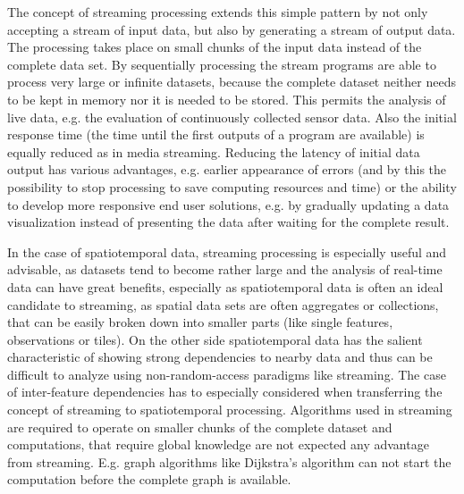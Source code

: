 	The concept of streaming processing extends this simple pattern by not only accepting a stream of input data, but also by generating a stream of output data. The processing takes place on small chunks of the input data instead of the complete data set. By sequentially processing the stream programs are able to process very large or infinite datasets, because the complete dataset neither needs to be kept in memory nor it is needed to be stored. This permits the analysis of live data, e.g. the evaluation of continuously collected sensor data. Also the initial response time (the time until the first outputs of a program are available) is equally reduced as in media streaming. Reducing the latency of initial data output has various advantages, e.g. earlier appearance of errors (and by this the possibility to stop processing to save computing resources and time) or the ability to develop more responsive end user solutions, e.g. by gradually updating a data visualization instead of presenting the data after waiting for the complete result.

	In the case of spatiotemporal data, streaming processing is especially useful and advisable, as datasets tend to become rather large and the analysis of real-time data can have great benefits, especially as spatiotemporal data is often an ideal candidate to streaming, as spatial data sets are often aggregates or collections, that can be easily broken down into smaller parts (like single features, observations or tiles). On the other side spatiotemporal data has the salient characteristic of showing strong dependencies to nearby data and thus can be difficult to analyze using non-random-access paradigms like streaming. The case of inter-feature dependencies has to especially considered when transferring the concept of streaming to spatiotemporal processing. Algorithms used in streaming are required to operate on smaller chunks of the complete dataset and computations, that require global knowledge are not expected any advantage from streaming. E.g. graph algorithms like Dijkstra's algorithm \citep{dijkstra} can not start the computation before the complete graph is available.

